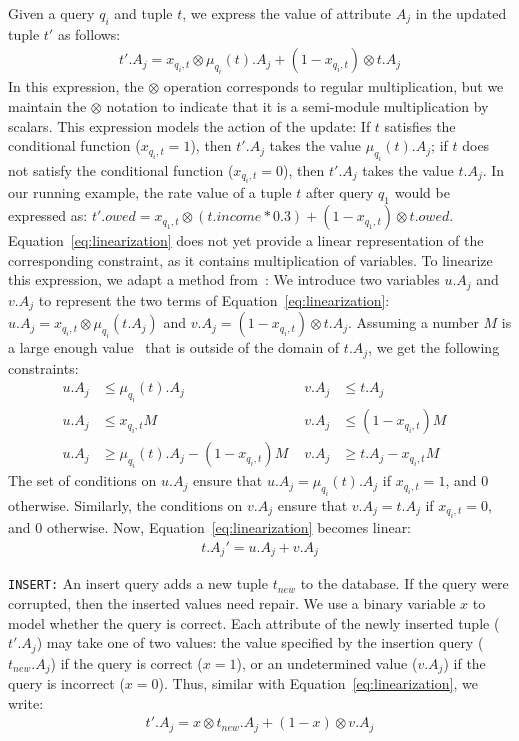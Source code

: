 Given a query $q_i$ and tuple $t$, we express the value of attribute $A_j$ in the updated tuple $t'$ as follows:
\begin{align}
\label{eq:linearization}
t'.A_j = x_{q_i, t}\otimes \mu_{q_i}(t).A_j + (1-x_{q_i, t})\otimes t.A_j 
\end{align} 
In this expression, the $\otimes$ operation corresponds to regular
multiplication, but we maintain the $\otimes$ notation to indicate
that it is a semi-module multiplication by scalars. This expression
models the action of the update: If $t$ satisfies the conditional
function ($x_{q_i, t}=1$), then $t'.A_j$ takes the value
$\mu_{q_i}(t).A_j$; if $t$ does not satisfy the conditional function
($x_{q_i, t}=0$), then $t'.A_j$ takes the value $t.A_j$.
In our running example, the rate value of a tuple $t$ after query $q_1$ would be expressed as:
$t'.owed = x_{q_1, t}\otimes (t.income*0.3) + (1-x_{q_1, t})\otimes t.owed$.
Equation~\eqref{eq:linearization} does not yet provide a linear
representation of the corresponding constraint, as it contains
multiplication of variables. To linearize this expression, we adapt a
method from~\cite{tiresias}: We introduce two variables $u.A_j$ and
$v.A_j$ to represent the two terms of
Equation~\eqref{eq:linearization}: $u.A_j=x_{q_i, t}\otimes
\mu_{q_i}(t.A_j)$ and $v.A_j=(1-x_{q_i, t})\otimes t.A_j$. Assuming a
number $M$ is a large enough value~\cite{bazaraa2011linear} that is outside of the domain of $t.A_j$, we get the
following constraints:
\begin{align}
\label{eq:uv}
u.A_j &\!\leq\! \mu_{q_i}(t).A_j   &v.A_j &\!\leq\! t.A_j &\nonumber\\
u.A_j &\!\leq\! x_{q_i, t}M        &v.A_j &\!\leq\! (1\!-\!x_{q_i, t})M &\\
u.A_j &\!\geq\! \mu_{q_i}(t).A_j \!-\! (1\!-\! x_{q_i, t})M \phantom{i} 
&v.A_j &\!\geq\! t.A_j \!-\! x_{q_i, t}M &\nonumber
\end{align}
The set of conditions on $u.A_j$ ensure that $u.A_j = \mu_{q_i}(t).A_j$ if $x_{q_i, t}=1$, and $0$ otherwise. Similarly, 
the conditions on $v.A_j$ ensure that $v.A_j = t.A_j$ if $x_{q_i, t}=0$, and $0$ otherwise.  
Now, Equation~\eqref{eq:linearization} becomes linear:
\begin{align}
\label{eq:tnew}
t.A_j' = u.A_j + v.A_j
\end{align}

\noindent\texttt{INSERT:}
An insert query adds a new tuple $t_{new}$ to the database.  If the query were 
corrupted, then the inserted values need repair. We use a binary variable $x$ to model whether the query is correct.  Each attribute of the newly inserted tuple ($t'.A_j$) may take one of two values: the value specified by the insertion query ($t_{new}.A_j$) if the query is correct ($x=1$), or an undetermined value ($v.A_j$) if the query is incorrect ($x=0$).  Thus, similar with Equation~\eqref{eq:linearization}, we write:
\begin{eqnarray}
\label{eq:insert}
t'.A_j = x \otimes t_{new}.A_j + (1-x) \otimes v.A_j 
\end{eqnarray}


